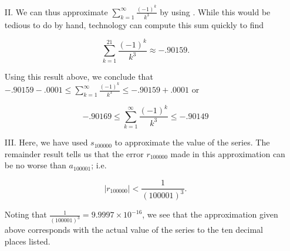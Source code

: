 \documentclass{ximera}
\begin{document}
\begin{example}
\begin{explanation}
\begin{itemize}
\item[II.] We can thus approximate $\sum_{k=1}^{\infty} \frac{(-1)^k}{k^3}$ by using .  While this would be tedious to do by hand, technology can compute this sum quickly to find 

\[
\sum_{k=1}^{21} \frac{(-1)^k}{k^3} \approx -.90159.
\]

Using this result above, we conclude that $-.90159-.0001 \leq \sum_{k=1}^{\infty} \frac{(-1)^k}{k^3} \leq -.90159+.0001$ or

\[
-.90169 \leq \sum_{k=1}^{\infty} \frac{(-1)^k}{k^3} \leq -.90149
\]
\item[III.] Here, we have used $s_{100000}$ to approximate the value of the series.  The remainder result tells us that the error $r_{100000}$ made in this approximation can be no worse than $a_{100001}$; i.e.

\[
\big|r_{100000}\big| < \frac{1}{(100001)^3}. 
\]

Noting that $\frac{1}{(100001)^3} = 9.9997 \times 10^{-16}$, we see that the approximation given above corresponds with the actual value of the series to the ten decimal places listed.

\end{itemize}
\end{explanation}
\end{example}
\end{document}
